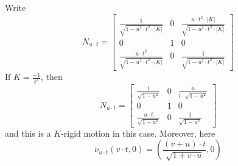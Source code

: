 \documentclass{ximera}
\begin{document}
Write
\[
N_{u\cdot t} = 
\begin{bmatrix}
  \frac{1}{\sqrt{1-u^2\cdot t^2\cdot|K|}} & 0 & \frac{u\cdot t^2\cdot|K|}{\sqrt{1-u^2\cdot t^2\cdot|K|}}\\
  0 & 1 & 0\\
  \frac{u\cdot t^2}{\sqrt{1-u^2\cdot t^2\cdot|K|}} & 0 & \frac{1}{\sqrt{1-u^2\cdot t^2\cdot|K|}}
\end{bmatrix}
\]
If $K=\frac{-1}{t^2}$, then 
\[
N_{u\cdot t} = 
\begin{bmatrix}
  \frac{1}{\sqrt{1-u^2}} & 0 & \frac{u}{t\cdot\sqrt{1-u^2}}\\
  0 & 1 & 0\\
  \frac{u\cdot t}{\sqrt{1-u^2}} & 0 & \frac{1}{\sqrt{1-u^2}}
\end{bmatrix}
\]
and this is a $K$-rigid motion in this case. Moreover, here
\[
\nu_{u\cdot t}(v\cdot t,0) = \left(\frac{(v+u)\cdot t}{\sqrt{1+v\cdot u}},0\right)  
\]
  
\end{document}

